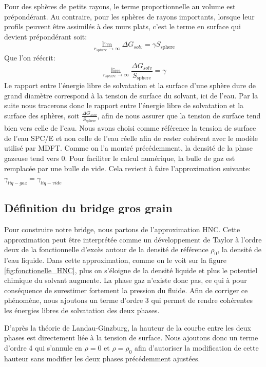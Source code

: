 \noindent Pour des sphères de petits rayons, le terme proportionnelle au volume est prépondérant.
Au contraire, pour les sphères de rayons importants, lorsque leur profils peuvent être assimilés à des murs plats, c'est le terme en surface qui devient prépondérant soit:
\begin{equation}
\lim\limits_{r_{sphere} \to \infty} \Delta G_{solv} = \gamma S_{\mathrm{sphere}} 
\end{equation}
Que l'on réécrit:
\begin{equation}
\lim\limits_{r_{sphere} \to \infty} \frac{\Delta G_{solv}}{S_{\mathrm{sphere}}} = \gamma 
\end{equation}
Le rapport entre l'énergie libre de solvatation et la surface d'une sphère dure de grand diamètre correspond à la tension de surface du solvant, ici de l'eau.
Par la suite nous tracerons donc le rapport entre l'énergie libre de solvatation et la surface des sphères, soit $\frac{\Delta G_{solv}}{S_{\mathrm{sphere}}}$, afin de nous assurer que la tension de surface tend bien vers celle de l'eau.
Nous avons choisi comme référence la tension de surface de l'eau SPC/E et non celle de l'eau réelle afin de rester cohérent avec le modèle utilisé par MDFT.
Comme on l'a montré précédemment, la densité de la phase gazeuse tend vers 0. Pour faciliter le calcul numérique, la bulle de gaz est remplacée par une bulle de vide. Cela revient à faire l'approximation suivante: $\gamma_{liq-gaz} = \gamma_{liq-vide}$



\subsection{Définition du bridge gros grain}
Pour construire notre bridge, nous partons de l'approximation HNC. Cette approximation peut être interprétée comme un développement de Taylor à l'ordre deux de la fonctionnelle d'excès autour de la densité de référence $\rho_{0}$, la densité de l'eau liquide.
Dans cette approximation, comme on le voit sur la figure \ref{fig:fonctionelle_HNC}, plus on s'éloigne de la densité liquide et plus le potentiel chimique du solvant augmente. La phase gaz n'existe donc pas, ce qui à pour conséquence de surestimer fortement la pression du fluide.
Afin de corriger ce phénomène, nous ajoutons un terme d'ordre 3 qui permet de rendre cohérentes les énergies libres de solvatation des deux phases.

D'après la théorie de Landau-Ginzburg\cite{Ginzburg2009}, la hauteur de la courbe entre les deux phases est directement liée à la tension de surface. Nous ajoutons donc un terme d'ordre 4 qui s'annule en $\rho=0$ et $\rho=\rho_0$ afin d'autoriser la modification de cette hauteur sans modifier les deux phases précédemment ajustées.

